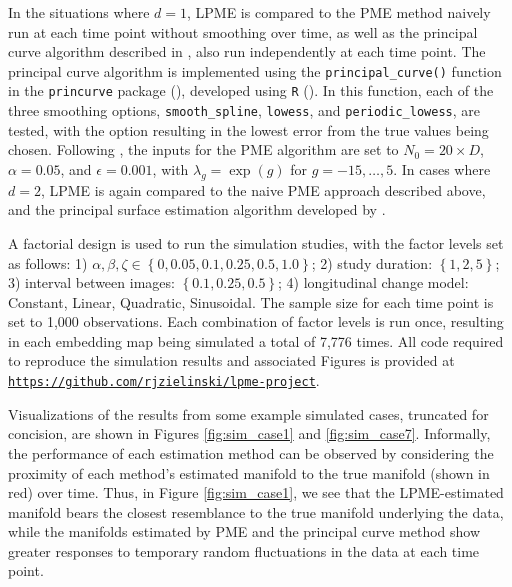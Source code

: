 \documentclass[12pt]{article}
\theoremstyle{definition}
\begin{document}
In the situations where $d = 1$, LPME is compared to the PME method naively run at each time point without smoothing over time, as well as the principal curve algorithm described in \cite{hastiePrincipalCurves1989}, also run independently at each time point. The principal curve algorithm is implemented using the \texttt{principal\_curve()} function in the \texttt{princurve} package (\cite{Cannoodt2018princurve}), developed using \texttt{R} (\cite{rSoftware2023}). In this function, each of the three smoothing options, \texttt{smooth\_spline}, \texttt{lowess}, and \texttt{periodic\_lowess}, are tested, with the option resulting in the lowest error from the true values being chosen. Following \cite{mengPrincipalManifoldEstimation2021}, the inputs for the PME algorithm are set to $N_0 = 20 \times D$, $\alpha = 0.05$, and $\epsilon = 0.001$, with $\lambda_g = \exp(g)$ for $g = -15, \dots, 5$. In cases where $d = 2$, LPME is again compared to the naive PME approach described above, and the principal surface estimation algorithm developed by \cite{yueParameterizationWhiteMatter2016}.

A factorial design is used to run the simulation studies, with the factor levels set as follows: 1) $\alpha, \beta, \zeta \in \left\{0, 0.05, 0.1, 0.25, 0.5, 1.0\right\}$; 2) study duration: $\left\{1, 2, 5\right\}$; 3) interval between images: $\left\{0.1, 0.25, 0.5\right\}$; 4) longitudinal change model: Constant, Linear, Quadratic, Sinusoidal. The sample size for each time point is set to 1,000 observations. Each combination of factor levels is run once, resulting in each embedding map being simulated a total of 7,776 times. All code required to reproduce the simulation results and associated Figures is provided at \href{https://github.com/rjzielinski/lpme-project}{\texttt{https://github.com/rjzielinski/lpme-project}}.

Visualizations of the results from some example simulated cases, truncated for concision, are shown in Figures \ref{fig:sim_case1} and \ref{fig:sim_case7}. Informally, the performance of each estimation method can be observed by considering the proximity of each method's estimated manifold to the true manifold (shown in red) over time. Thus, in Figure \ref{fig:sim_case1}, we see that the LPME-estimated manifold bears the closest resemblance to the true manifold underlying the data, while the manifolds estimated by PME and the principal curve method show greater responses to temporary random fluctuations in the data at each time point.
\end{document}
